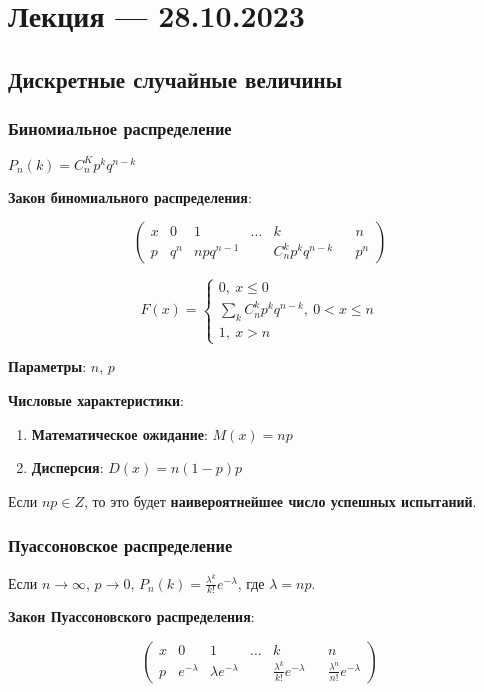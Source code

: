 \documentclass{article}
\begin{document}
\section{Лекция — 28.10.2023}

\subsection{Дискретные случайные величины}

\subsubsection{Биномиальное распределение}

$P_n(k) = C_n^K p^k q^{n - k}$

\textbf{Закон биномиального распределения}:

$$
\begin{pmatrix}
  x & 0 & 1 & \dots & k & & n \\
  p & q^{n} & n p q^{n - 1} & & C_n^k p^k q^{n - k} & & p^n
\end{pmatrix}
$$

$$
F(x) = \begin{cases}
    0, \ x \le 0 \\
    \sum\limits_{k} C_{n}^{k} p^{k} q^{n - k}, \ 0 < x \le n \\
    1, \ x > n
\end{cases}
$$

\textbf{Параметры}: $n$, $p$

\textbf{Числовые характеристики}:

\begin{enumerate}
    \item \textbf{Математическое ожидание}:
    $M(x) = np$
    \item \textbf{Дисперсия}:
    $D(x) = n(1-p)p$
\end{enumerate}

Если $np \in Z$, то это будет \textbf{наивероятнейшее число успешных испытаний}.

\subsubsection{Пуассоновское распределение}

Если $n \to \infty$, $p \to 0$, $P_n(k) = \frac{\lambda^k}{k!} e^{-\lambda}$, где $\lambda = np$.

\textbf{Закон Пуассоновского распределения}:

$$
\begin{pmatrix}
  x & 0 & 1 & \dots & k & & n \\
  p & e^{-\lambda} & \lambda e^{-\lambda} & & \frac{\lambda^{k}}{k!} e^{-\lambda} & & \frac{\lambda^{n}}{n!} e^{-\lambda}
\end{pmatrix}
$$
\end{document}
